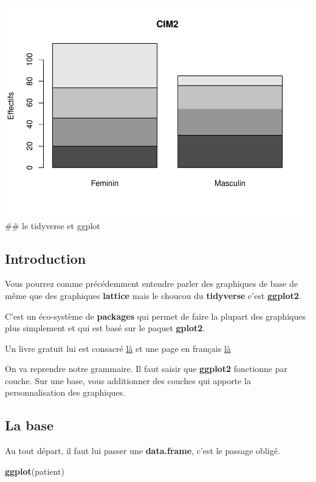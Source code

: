 \documentclass[
]{book}
\newenvironment{Shaded}{\begin{snugshade}}{\end{snugshade}}
\newcommand{\FunctionTok}[1]{\textcolor[rgb]{0.13,0.29,0.53}{\textbf{#1}}}
\newcommand{\NormalTok}[1]{#1}
\begin{document}
\includegraphics{_main_files/figure-latex/sexe2-1.pdf}
\#\# le tidyverse et ggplot

\hypertarget{introduction-1}{%
\subsection{Introduction}\label{introduction-1}}

Vous pourrez comme précédemment entendre parler des graphiques de base de même
que des graphiques \textbf{lattice} mais le choucou du \textbf{tidyverse} c'est \textbf{ggplot2}.

C'est un éco-système de \textbf{packages} qui permet de faire la plupart des graphiques
plus simplement et qui est basé sur le paquet \textbf{gplot2}.

Un livre gratuit lui est consacré \href{https://ggplot2-book.org/}{là} et une page
en français \href{https://larmarange.github.io/analyse-R/graphiques-bivaries-ggplot2.html}{là}

On va reprendre notre grammaire. Il faut saisir que \textbf{ggplot2} fonctionne par
couche. Sur une base, vous additionner des couches qui apporte la personnalisation
des graphiques.

\hypertarget{la-base}{%
\subsection{La base}\label{la-base}}

Au tout départ, il faut lui passer une \textbf{data.frame}, c'est le passage obligé.

\begin{Shaded}
\begin{Highlighting}[]
\FunctionTok{ggplot}\NormalTok{(patient)}
\end{Highlighting}
\end{Shaded}
\end{document}
